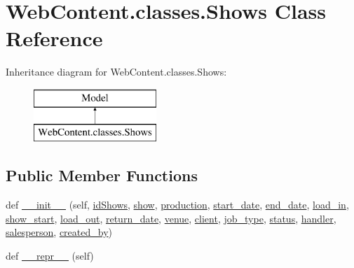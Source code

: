 \hypertarget{class_web_content_1_1classes_1_1_shows}{}\section{Web\+Content.\+classes.\+Shows Class Reference}
\label{class_web_content_1_1classes_1_1_shows}
Inheritance diagram for Web\+Content.\+classes.\+Shows\+:\begin{figure}[H]
\begin{center}
\leavevmode
\includegraphics[height=2.000000cm]{class_web_content_1_1classes_1_1_shows}
\end{center}
\end{figure}
\subsection*{Public Member Functions}
\begin{DoxyCompactItemize}
\item 
def \hyperlink{class_web_content_1_1classes_1_1_shows_a0b3f8378e782b5f62fceb65380881216}{\+\_\+\+\_\+init\+\_\+\+\_\+} (self, \hyperlink{class_web_content_1_1classes_1_1_shows_a9ed1265f6e8a1078de474691f846f793}{id\+Shows}, \hyperlink{class_web_content_1_1classes_1_1_shows_aec2efee9bcdad6b3a4732d6327d7f25c}{show}, \hyperlink{class_web_content_1_1classes_1_1_shows_adc73b524e8f3e05611ab8f4a3b0543c1}{production}, \hyperlink{class_web_content_1_1classes_1_1_shows_a6c17ca935d1ab7bce12c2ad5a55bfd0e}{start\+\_\+date}, \hyperlink{class_web_content_1_1classes_1_1_shows_a8e22ab3d1b30b350f3464bcd61b3ab8a}{end\+\_\+date}, \hyperlink{class_web_content_1_1classes_1_1_shows_ae41baa66efcab2e7d85ceae9e3a7412e}{load\+\_\+in}, \hyperlink{class_web_content_1_1classes_1_1_shows_ad70665816e2050b3176e90e95655f3fb}{show\+\_\+start}, \hyperlink{class_web_content_1_1classes_1_1_shows_a3e62a0e6c2317a0250bfb3367294f068}{load\+\_\+out}, \hyperlink{class_web_content_1_1classes_1_1_shows_aee5eee42b3d279a14f401c113d79083c}{return\+\_\+date}, \hyperlink{class_web_content_1_1classes_1_1_shows_ac931bd921ecb35a0e221ff9133162d2c}{venue}, \hyperlink{class_web_content_1_1classes_1_1_shows_ad95c8895e4633584f7da017e2b79f45d}{client}, \hyperlink{class_web_content_1_1classes_1_1_shows_ae5f65ed709a0218f1298610e91500719}{job\+\_\+type}, \hyperlink{class_web_content_1_1classes_1_1_shows_ae116171a1ecb47ad43e5631115fe9f43}{status}, \hyperlink{class_web_content_1_1classes_1_1_shows_a23219663a5b011841e8054fc6ca88e0f}{handler}, \hyperlink{class_web_content_1_1classes_1_1_shows_a59168ff70138cf3bafb49d58bc7e4cbe}{salesperson}, \hyperlink{class_web_content_1_1classes_1_1_shows_a1c11f5ef467e4230b4672c40cd7268fe}{created\+\_\+by})
\item 
def \hyperlink{class_web_content_1_1classes_1_1_shows_a6691b87ec53fa9349d04a41317fd1bee}{\+\_\+\+\_\+repr\+\_\+\+\_\+} (self)
\end{DoxyCompactItemize}

